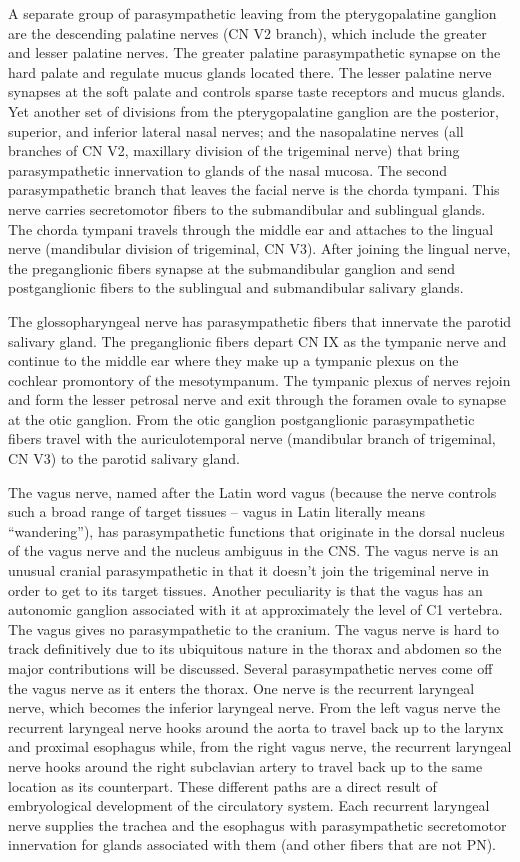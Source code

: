 \documentclass[]{book}
\begin{document}
A separate group of parasympathetic leaving from the pterygopalatine ganglion are the descending palatine nerves (CN V2 branch), which include the greater and lesser palatine nerves. The greater palatine parasympathetic synapse on the hard palate and regulate mucus glands located there. The lesser palatine nerve synapses at the soft palate and controls sparse taste receptors and mucus glands. Yet another set of divisions from the pterygopalatine ganglion are the posterior, superior, and inferior lateral nasal nerves; and the nasopalatine nerves (all branches of CN V2, maxillary division of the trigeminal nerve) that bring parasympathetic innervation to glands of the nasal mucosa. The second parasympathetic branch that leaves the facial nerve is the chorda tympani. This nerve carries secretomotor fibers to the submandibular and sublingual glands. The chorda tympani travels through the middle ear and attaches to the lingual nerve (mandibular division of trigeminal, CN V3). After joining the lingual nerve, the preganglionic fibers synapse at the submandibular ganglion and send postganglionic fibers to the sublingual and submandibular salivary glands.

The glossopharyngeal nerve has parasympathetic fibers that innervate the parotid salivary gland. The preganglionic fibers depart CN IX as the tympanic nerve and continue to the middle ear where they make up a tympanic plexus on the cochlear promontory of the mesotympanum. The tympanic plexus of nerves rejoin and form the lesser petrosal nerve and exit through the foramen ovale to synapse at the otic ganglion. From the otic ganglion postganglionic parasympathetic fibers travel with the auriculotemporal nerve (mandibular branch of trigeminal, CN V3) to the parotid salivary gland.

The vagus nerve, named after the Latin word vagus (because the nerve controls such a broad range of target tissues -- vagus in Latin literally means ``wandering''), has parasympathetic functions that originate in the dorsal nucleus of the vagus nerve and the nucleus ambiguus in the CNS. The vagus nerve is an unusual cranial parasympathetic in that it doesn't join the trigeminal nerve in order to get to its target tissues. Another peculiarity is that the vagus has an autonomic ganglion associated with it at approximately the level of C1 vertebra. The vagus gives no parasympathetic to the cranium. The vagus nerve is hard to track definitively due to its ubiquitous nature in the thorax and abdomen so the major contributions will be discussed. Several parasympathetic nerves come off the vagus nerve as it enters the thorax. One nerve is the recurrent laryngeal nerve, which becomes the inferior laryngeal nerve. From the left vagus nerve the recurrent laryngeal nerve hooks around the aorta to travel back up to the larynx and proximal esophagus while, from the right vagus nerve, the recurrent laryngeal nerve hooks around the right subclavian artery to travel back up to the same location as its counterpart. These different paths are a direct result of embryological development of the circulatory system. Each recurrent laryngeal nerve supplies the trachea and the esophagus with parasympathetic secretomotor innervation for glands associated with them (and other fibers that are not PN).
\end{document}
